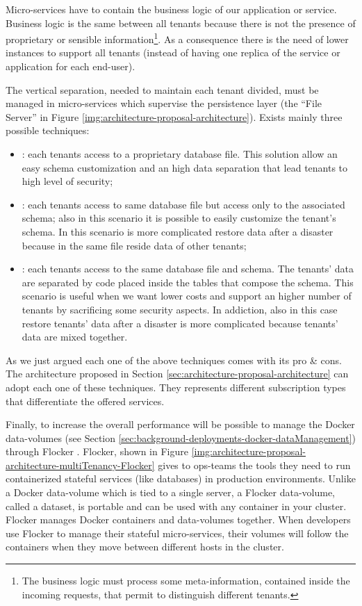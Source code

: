 Micro-services have to contain the business logic of our application or service. Business logic is
the same between all tenants because there is not the presence of proprietary or sensible information\footnote{
	The business logic must process some meta-information, contained inside the incoming requests, that permit to
	distinguish different tenants.}. As a consequence there is the need of lower instances to support all tenants
(instead of having one replica of the service or application for each end-user).

The vertical separation, needed to maintain each tenant divided, must be managed in micro-services
which supervise the persistence layer (the ``File Server'' in Figure
\ref{img:architecture-proposal-architecture}). Exists mainly three possible techniques:

\begin{itemize}
	\item{: each tenants access to a proprietary database file. This solution
		allow an easy schema customization and an high data separation that lead tenants to high level of security;}
	\item{: each tenants access to same database file but access
		only to the associated schema; also in this scenario it is possible to easily customize the tenant's schema.
		In this scenario is more complicated restore data after a disaster because in the same file reside data of
		other tenants;}
	\item{: each tenants access to the same database file and schema.
		The tenants' data are separated by code placed inside the tables that compose the schema. This scenario is
		useful when we want lower costs and support an higher number of tenants by sacrificing some security aspects.
		In addiction, also in this case restore tenants' data after a disaster is more complicated because tenants'
		data are mixed together.}
\end{itemize}

As we just argued each one of the above techniques comes with its pro \& cons. The architecture
proposed in Section \ref{sec:architecture-proposal-architecture} can adopt each one of these
techniques. They represents different subscription types that differentiate the offered services.

Finally, to increase the overall performance will be possible to manage the Docker data-volumes
(see Section \ref{sec:background-deployments-docker-dataManagement}) through Flocker \cite{flockerHomepage}.
Flocker, shown in Figure \ref{img:architecture-proposal-architecture-multiTenancy-Flocker} gives to
ops-teams the tools they need to run containerized stateful services (like databases) in production
environments. Unlike a Docker data-volume which is tied to a single server, a Flocker data-volume,
called a dataset, is portable and can be used with any container in your cluster. Flocker manages Docker
containers and data-volumes together. When developers use Flocker to manage their stateful micro-services,
their volumes will follow the containers when they move between different hosts in the cluster.

